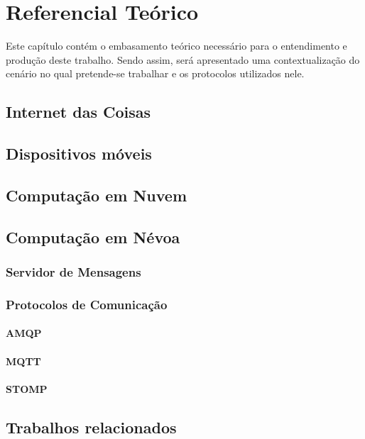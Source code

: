 
\chapter{Referencial Teórico}
\label{chap:revisaodeliteratura}

Este capítulo contém o embasamento teórico necessário para o entendimento e produção deste trabalho. Sendo assim, será apresentado uma contextualização do cenário no qual pretende-se trabalhar e os protocolos utilizados nele.

\section{\textbf{Internet das Coisas}}

\section{\textbf{Dispositivos móveis}}

\section{\textbf{Computação em Nuvem}}

\section{\textbf{Computação em Névoa}}

\subsection{\textbf{Servidor de Mensagens}}

\subsection{\textbf{Protocolos de Comunicação}}

\subsubsection{\textbf{AMQP}}

\subsubsection{\textbf{MQTT}}

\subsubsection{\textbf{STOMP}}

\section{\textbf{Trabalhos relacionados}}
\label{sec:trabalhosrelacionados}

\lipsum[11-12] %

